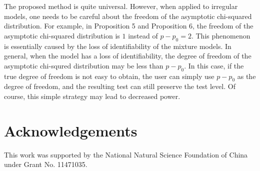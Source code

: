 \documentclass[11pt]{article}
\theoremstyle{plain}
\theoremstyle{definition}
\theoremstyle{remark}
\begin{document}
The proposed method is quite universal. 
However, when applied to irregular models, one needs to be careful about the freedom of the asymptotic chi-squared distribution.
For example, in Proposition 5 and Proposition 6, the freedom of the asymptotic chi-squared distribution is $1$ instead of $p-p_0 = 2$.
This phenomenon is essentially caused by the loss of identifiability of the mixture models.
In general, when the model has a loss of identifiability, the degree of freedom of the asymptotic chi-squred distribution may be less than $p-p_0$.
In this case, if the true degree of freedom is not easy to obtain, the user can simply use $p-p_0$ as the degree of freedom, and the resulting test can still preserve the test level.
Of course, this simple strategy may lead to decreased power.

\section*{Acknowledgements}
This work was supported by the National Natural Science Foundation of China under Grant No. 11471035.
\end{document}
